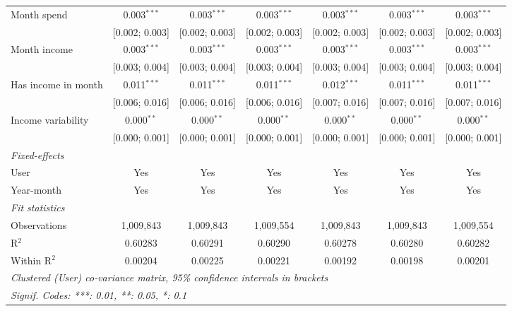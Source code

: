 \begin{table}[htbp]
\begin{threeparttable}[b]
\begin{tabular}{lcccccc}
         Month spend                    & 0.003$^{***}$  & 0.003$^{***}$  & 0.003$^{***}$  & 0.003$^{***}$   & 0.003$^{***}$    & 0.003$^{***}$\\   
                                        & [0.002; 0.003] & [0.002; 0.003] & [0.002; 0.003] & [0.002; 0.003]  & [0.002; 0.003]   & [0.002; 0.003]\\   
         Month income                   & 0.003$^{***}$  & 0.003$^{***}$  & 0.003$^{***}$  & 0.003$^{***}$   & 0.003$^{***}$    & 0.003$^{***}$\\   
                                        & [0.003; 0.004] & [0.003; 0.004] & [0.003; 0.004] & [0.003; 0.004]  & [0.003; 0.004]   & [0.003; 0.004]\\   
         Has income in month            & 0.011$^{***}$  & 0.011$^{***}$  & 0.011$^{***}$  & 0.012$^{***}$   & 0.011$^{***}$    & 0.011$^{***}$\\   
                                        & [0.006; 0.016] & [0.006; 0.016] & [0.006; 0.016] & [0.007; 0.016]  & [0.007; 0.016]   & [0.007; 0.016]\\   
         Income variability             & 0.000$^{**}$   & 0.000$^{**}$   & 0.000$^{**}$   & 0.000$^{**}$    & 0.000$^{**}$     & 0.000$^{**}$\\   
                                        & [0.000; 0.001] & [0.000; 0.001] & [0.000; 0.001] & [0.000; 0.001]  & [0.000; 0.001]   & [0.000; 0.001]\\   
         \midrule
         \emph{Fixed-effects}\\
         User                           & Yes            & Yes            & Yes            & Yes             & Yes              & Yes\\  
         Year-month                     & Yes            & Yes            & Yes            & Yes             & Yes              & Yes\\  
         \midrule
         \emph{Fit statistics}\\
         Observations                   & 1,009,843      & 1,009,843      & 1,009,554      & 1,009,843       & 1,009,843        & 1,009,554\\  
         R$^2$                          & 0.60283        & 0.60291        & 0.60290        & 0.60278         & 0.60280          & 0.60282\\  
         Within R$^2$                   & 0.00204        & 0.00225        & 0.00221        & 0.00192         & 0.00198          & 0.00201\\  
         \midrule \midrule
         \multicolumn{7}{l}{\emph{Clustered (User) co-variance matrix, 95\% confidence intervals in brackets}}\\
         \multicolumn{7}{l}{\emph{Signif. Codes: ***: 0.01, **: 0.05, *: 0.1}}\\
      \end{tabular}
   \end{threeparttable}
\end{table}


